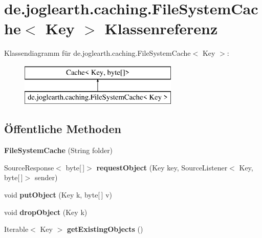 \section{de.\-joglearth.\-caching.\-File\-System\-Cache$<$ Key $>$ Klassenreferenz}
\label{classde_1_1joglearth_1_1caching_1_1_file_system_cache_3_01_key_01_4}
Klassendiagramm für de.\-joglearth.\-caching.\-File\-System\-Cache$<$ Key $>$\-:\begin{figure}[H]
\begin{center}
\leavevmode
\includegraphics[height=2.000000cm]{classde_1_1joglearth_1_1caching_1_1_file_system_cache_3_01_key_01_4}
\end{center}
\end{figure}
\subsection*{Öffentliche Methoden}
\begin{DoxyCompactItemize}
\item 
{\bfseries File\-System\-Cache} (String folder)\label{classde_1_1joglearth_1_1caching_1_1_file_system_cache_3_01_key_01_4_a28751da2656ace2ecc9e0275c98c142e}

\item 
Source\-Response$<$ byte[$\,$]$>$ {\bfseries request\-Object} (Key key, Source\-Listener$<$ Key, byte[$\,$]$>$ sender)\label{classde_1_1joglearth_1_1caching_1_1_file_system_cache_3_01_key_01_4_a34b649126fadce4f124e3ad0e596b570}

\item 
void {\bfseries put\-Object} (Key k, byte[$\,$] v)\label{classde_1_1joglearth_1_1caching_1_1_file_system_cache_3_01_key_01_4_a0e31b94259fd3f6549c72d8d313d5ec0}

\item 
void {\bfseries drop\-Object} (Key k)\label{classde_1_1joglearth_1_1caching_1_1_file_system_cache_3_01_key_01_4_aa2a5b8b045d16e5cc65e009c34e8cd36}

\item 
Iterable$<$ Key $>$ {\bfseries get\-Existing\-Objects} ()\label{classde_1_1joglearth_1_1caching_1_1_file_system_cache_3_01_key_01_4_a7024abb321232af58c588ca8ae1ad8b6}

\end{DoxyCompactItemize}

